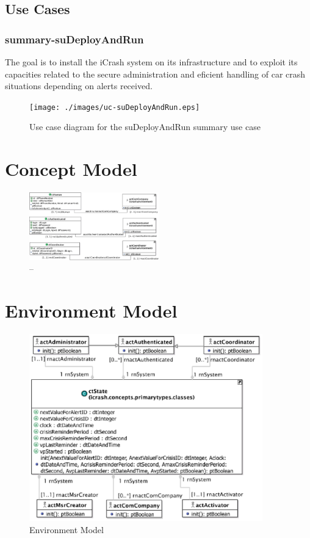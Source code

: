 \subsection{Use Cases}

\subsubsection{summary-suDeployAndRun}

The goal is to install the iCrash system on its infrastructure and to exploit its capacities related to the
secure administration and eficient handling of car crash situations depending on
alerts received.


\begin{figure}[h]
	\centering	
	\captionsetup{justification=centering}
	\texttt{[image: ./images/uc-suDeployAndRun.eps]}
	\caption{Use case diagram for the suDeployAndRun summary use case}
\end{figure}


\section{Concept Model}
 

\begin{figure}[h]
	\centering
	\captionsetup{justification=centering}
	\includegraphics[width=0.5\textwidth]{./images/analysis/concept-model/global/PrimaryTypes-Classes/01/cm-pt-ct-gv-01.eps}
	\caption{--}
\end{figure} 


   

\section{Environment Model}

\begin{figure}[h]
\begin{center}
\includegraphics[width=0.9\textwidth]{./images/env_model.eps}
\end{center}
\caption{Environment Model}
\end{figure}
